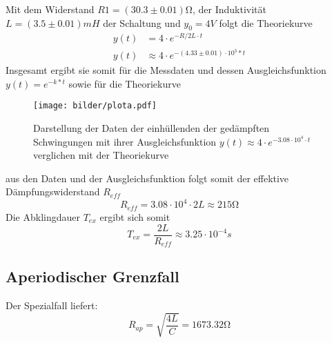 Mit dem Widerstand $R1=(30.3\pm0.01)\si{\ohm}$, der Induktivität $L=(3.5 \pm 0.01)mH$ der Schaltung und $y_0=4V$ folgt die Theoriekurve
\begin{align}
    y(t)&=4 \cdot e^{-R/2L \cdot t}\\
    y(t)&\approx 4 \cdot e^{-(4.33\pm0.01) \cdot 10^3*t}
\end{align}
\newpage
Insgesamt ergibt sie somit für die Messdaten und dessen Ausgleichsfunktion $y(t)=e^{-k*t}$
sowie für die Theoriekurve
\begin{figure}
    \centering
    \texttt{[image: bilder/plota.pdf]}
    \caption{
        Darstellung der Daten der einhüllenden der gedämpften Schwingungen mit ihrer
        Ausgleichsfunktion $y(t)\approx 4 \cdot e^{-3.08\cdot10^4 \cdot t}$ verglichen mit der Theoriekurve
    }
    \label{fig:ultra_plot}
\end{figure}
aus den Daten und der Ausgleichsfunktion folgt somit der effektive Dämpfungswiderstand 
$R_{eff}$
\begin{equation}
    R_{eff}= 3.08\cdot10^4 \cdot 2L \approx 215\si{\ohm}
\end{equation}
Die Abklingdauer $T_{ex}$ ergibt sich somit
\begin{equation}
    T_{ex}=\frac{2L}{R_{eff}}\approx 3.25 \cdot 10^{-4}s
\end{equation}
\label{sec:Auswertung}

\subsection{Aperiodischer Grenzfall}
Der Spezialfall liefert:
\begin{equation}
    R_{ap}=\sqrt{\frac{4L}{C}}=1673.32\si{\ohm}     %
\end{equation}
\subsection{}


